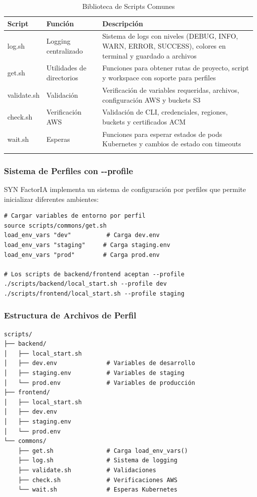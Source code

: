\documentclass[12pt,a4paper,spanish]{article}
\begin{document}
\begin{longtable}{|p{3cm}|p{5cm}|p{5cm}|}
\toprule
\textbf{Script} & \textbf{Función} & \textbf{Descripción} \\
\midrule
log.sh & Logging centralizado & Sistema de logs con niveles (DEBUG, INFO, WARN, ERROR, SUCCESS), colores en terminal y guardado a archivos \\
\midrule
get.sh & Utilidades de directorios & Funciones para obtener rutas de proyecto, script y workspace con soporte para perfiles \\
\midrule
validate.sh & Validación & Verificación de variables requeridas, archivos, configuración AWS y buckets S3 \\
\midrule
check.sh & Verificación AWS & Validación de CLI, credenciales, regiones, buckets y certificados ACM \\
\midrule
wait.sh & Esperas & Funciones para esperar estados de pods Kubernetes y cambios de estado con timeouts \\
\bottomrule
\caption{Biblioteca de Scripts Comunes}
\end{longtable}

\subsubsection{Sistema de Perfiles con -{}-profile}

SYN FactorIA implementa un sistema de configuración por perfiles que permite inicializar diferentes ambientes:

\begin{verbatim}
# Cargar variables de entorno por perfil
source scripts/commons/get.sh
load_env_vars "dev"          # Carga dev.env
load_env_vars "staging"     # Carga staging.env
load_env_vars "prod"        # Carga prod.env

# Los scripts de backend/frontend aceptan --profile
./scripts/backend/local_start.sh --profile dev
./scripts/frontend/local_start.sh --profile staging
\end{verbatim}

\subsubsection{Estructura de Archivos de Perfil}

\begin{verbatim}
scripts/
├── backend/
│   ├── local_start.sh
│   ├── dev.env              # Variables de desarrollo
│   ├── staging.env          # Variables de staging
│   └── prod.env             # Variables de producción
├── frontend/
│   ├── local_start.sh
│   ├── dev.env
│   ├── staging.env
│   └── prod.env
└── commons/
    ├── get.sh               # Carga load_env_vars()
    ├── log.sh               # Sistema de logging
    ├── validate.sh          # Validaciones
    ├── check.sh             # Verificaciones AWS
    └── wait.sh              # Esperas Kubernetes
\end{verbatim}
\end{document}
